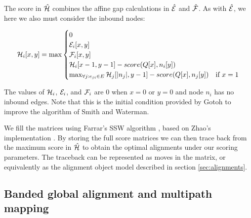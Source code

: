\documentclass[a4paper,12pt,numbered,oneside]{Classes/PhDThesisPSnPDF}
\begin{document}
The score in $\hat{\cal H}$ combines the affine gap calculations in $\hat{\cal E}$ and $\hat{\cal F}$.
As with $\hat{\cal E}$, we here we also must consider the inbound nodes:

\begin{equation}
  \label{eqn:gssw_h}
  {\cal H}_i[x,y] = \max
  \begin{cases}
    0 \\
    {\cal E}_i[x,y] \\
    {\cal F}_i[x,y] \\
    {\cal H}_i[x-1,y-1] - score(Q[x], n_i[y])\\
    \max_{\forall j : e_{ji} \in E} {\cal H}_j[|n_j|,y-1] - score(Q[x], n_j[y]) & \text{if } x = 1 \\
  \end{cases}
\end{equation}

The values of ${\cal H}_i$, ${\cal E}_i$, and ${\cal F}_i$ are 0 when $x = 0$ or $y = 0$ and node $n_i$ has no inbound edges.
Note that this is the initial condition provided by Gotoh to improve the algorithm of Smith and Waterman.

We fill the matrices using Farrar's SSW algorithm \cite{farrar2007striped}, based on Zhao's implementation \cite{zhao2013ssw}.
By storing the full score matrices we can then trace back from the maximum score in $\hat{\cal H}$ to obtain the optimal alignments under our scoring parameters.
The traceback can be represented as moves in the matrix, or equivalently as the alignment object model described in section \ref{sec:alignments}.

\subsection{Banded global alignment and multipath mapping}
\label{sec:banded_global}
\end{document}
